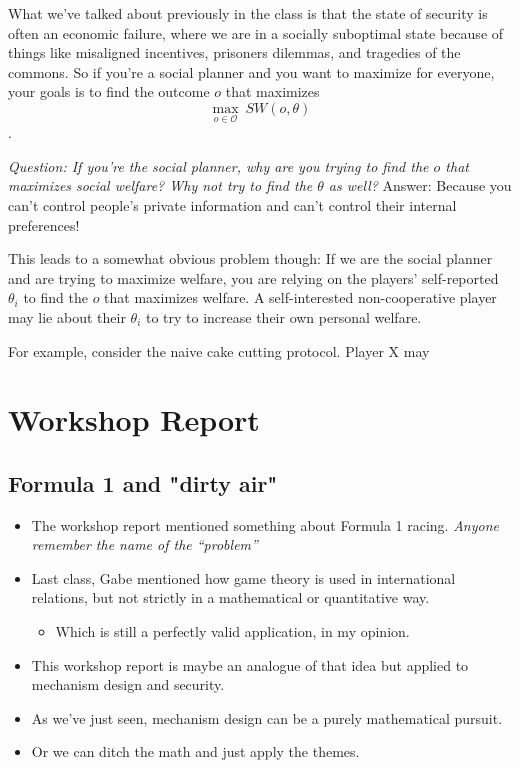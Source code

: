 \documentclass[11pt]{article}
\begin{document}
What we've talked about previously in the class is that the state of security is often an economic failure, where we are in a socially suboptimal state because of things like misaligned incentives, prisoners dilemmas, and tragedies of the commons. 
So if you're a social planner and you want to maximize for everyone, your goals is to find the outcome $o$ that maximizes 
$$ \max_{o \in \mathcal{O}}~SW(o, \theta)$$.

{\it Question: If you're the social planner, why are you trying to find the $o$ that maximizes social welfare? Why not try to find the $\theta$ as well?} Answer: Because you can't control people's private information and can't control their internal preferences!

This leads to a somewhat obvious problem though: If we are the social planner and are trying to maximize welfare, you are relying on the players' self-reported $\theta_i$ to find the $o$ that maximizes welfare. A self-interested non-cooperative player may lie about their $\theta_i$ to try to increase their own personal welfare. 

For example, consider the naive cake cutting protocol. Player X may 



\section{Workshop Report}

\subsection{Formula 1 and "dirty air"}

\begin{itemize}
    \item The workshop report mentioned something about Formula 1 racing. {\it Anyone remember the name of the ``problem''}
    \item Last class, Gabe mentioned how game theory is used in international relations, but not strictly in a mathematical or quantitative way. 
    \begin{itemize}
        \item Which is still a perfectly valid application, in my opinion. 
    \end{itemize}
    \item This workshop report is maybe an analogue of that idea but applied to mechanism design and security.
    \item As we've just seen, mechanism design can be a purely mathematical pursuit.
    \item Or we can ditch the math and just apply the themes. 
\end{itemize}
\end{document}
